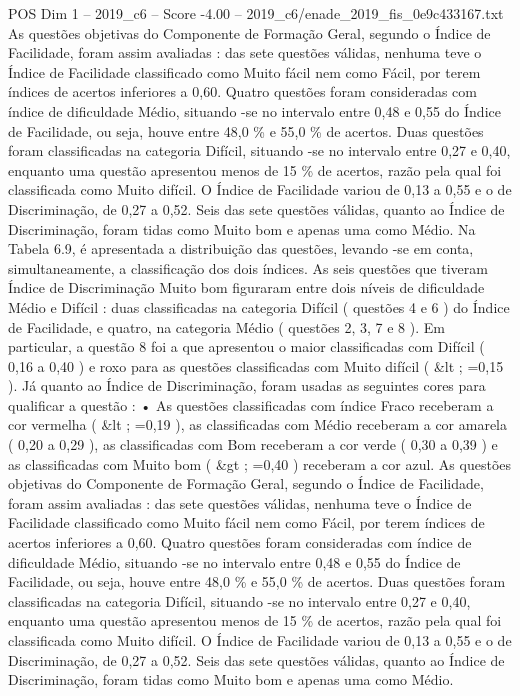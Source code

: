 \begin{textsample}{POS Dim 1 – 2019\_c6 – Score -4.00 – 2019\_c6/enade\_2019\_fis\_0e9c433167.txt}
As questões objetivas do Componente de Formação Geral, segundo o Índice de Facilidade, foram assim avaliadas : das sete questões válidas, nenhuma teve o Índice de Facilidade classificado como Muito fácil nem como Fácil, por terem índices de acertos inferiores a 0,60.
Quatro questões foram consideradas com índice de dificuldade Médio, situando -se no intervalo entre 0,48 e 0,55 do Índice de Facilidade, ou seja, houve entre 48,0 \% e 55,0 \% de acertos.
Duas questões foram classificadas na categoria Difícil, situando -se no intervalo entre 0,27 e 0,40, enquanto uma questão apresentou menos de 15 \% de acertos, razão pela qual foi classificada como Muito difícil.
O Índice de Facilidade variou de 0,13 a 0,55 e o de Discriminação, de 0,27 a 0,52.
Seis das sete questões válidas, quanto ao Índice de Discriminação, foram tidas como Muito bom e apenas uma como Médio.
Na Tabela 6.9, é apresentada a distribuição das questões, levando -se em conta, simultaneamente, a classificação dos dois índices.
As seis questões que tiveram Índice de Discriminação Muito bom figuraram entre dois níveis de dificuldade Médio e Difícil : duas classificadas na categoria Difícil ( questões 4 e 6 ) do Índice de Facilidade, e quatro, na categoria Médio ( questões 2, 3, 7 e 8 ).
Em particular, a questão 8 foi a que apresentou o maior classificadas com Difícil ( 0,16 a 0,40 ) e roxo para as questões classificadas com Muito difícil ( \&lt ; =0,15 ).
Já quanto ao Índice de Discriminação, foram usadas as seguintes cores para qualificar a questão : • As questões classificadas com índice Fraco receberam a cor vermelha ( \&lt ; =0,19 ), as classificadas com Médio receberam a cor amarela ( 0,20 a 0,29 ), as classificadas com Bom receberam a cor verde ( 0,30 a 0,39 ) e as classificadas com Muito bom ( \&gt ; =0,40 ) receberam a cor azul.
As questões objetivas do Componente de Formação Geral, segundo o Índice de Facilidade, foram assim avaliadas : das sete questões válidas, nenhuma teve o Índice de Facilidade classificado como Muito fácil nem como Fácil, por terem índices de acertos inferiores a 0,60.
Quatro questões foram consideradas com índice de dificuldade Médio, situando -se no intervalo entre 0,48 e 0,55 do Índice de Facilidade, ou seja, houve entre 48,0 \% e 55,0 \% de acertos.
Duas questões foram classificadas na categoria Difícil, situando -se no intervalo entre 0,27 e 0,40, enquanto uma questão apresentou menos de 15 \% de acertos, razão pela qual foi classificada como Muito difícil.
O Índice de Facilidade variou de 0,13 a 0,55 e o de Discriminação, de 0,27 a 0,52.
Seis das sete questões válidas, quanto ao Índice de Discriminação, foram tidas como Muito bom e apenas uma como Médio.

\end{textsample}
